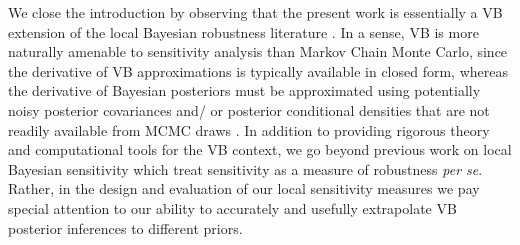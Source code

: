 We close the introduction by observing that  the present work is essentially a
VB extension of the local Bayesian robustness literature
\citet{gustafson:1996:local, basu:1996:local}.  In a sense, VB is more naturally
amenable to sensitivity analysis than Markov Chain Monte Carlo, since the
derivative of VB approximations is typically available in closed form, whereas
the derivative of Bayesian posteriors must be approximated using potentially
noisy posterior covariances and/ or posterior conditional densities that are not
readily available from MCMC draws \citep{gustafson:1996:marginal}.  In addition
to providing rigorous theory and computational tools for the VB context, we go
beyond previous work on local Bayesian sensitivity which treat sensitivity as a
measure of robustness \textit{per se}.  Rather, in the design and evaluation of
our local sensitivity measures we pay special attention to our ability to
accurately and usefully extrapolate VB posterior inferences to different priors.




